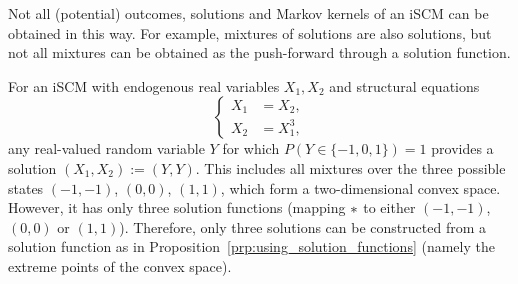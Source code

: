 Not all (potential) outcomes, solutions and Markov kernels of an iSCM can be obtained in this way. 
For example, mixtures of solutions are also solutions, but not all mixtures can be obtained as the push-forward through a solution function.
\begin{Eg}\label{eg:not_each_solution_from_push_forward}
For an iSCM with endogenous real variables $X_1,X_2$ and structural equations 
$$\begin{cases}
  X_1 &= X_2,\\
  X_2 &= X_1^3,
\end{cases}$$
any real-valued random variable $Y$ for which $P(Y \in \{-1,0,1\}) = 1$
provides a solution $(X_1,X_2) := (Y,Y)$. This includes all mixtures over the three
possible states $(-1,-1)$, $(0,0)$, $(1,1)$, which form a two-dimensional convex
space. However, it has only three solution functions (mapping $*$ to
either $(-1,-1)$, $(0,0)$ or $(1,1)$).
Therefore, only three solutions can be constructed from a solution function as in Proposition~\ref{prp:using_solution_functions} (namely the extreme points of the convex space).
\end{Eg}


